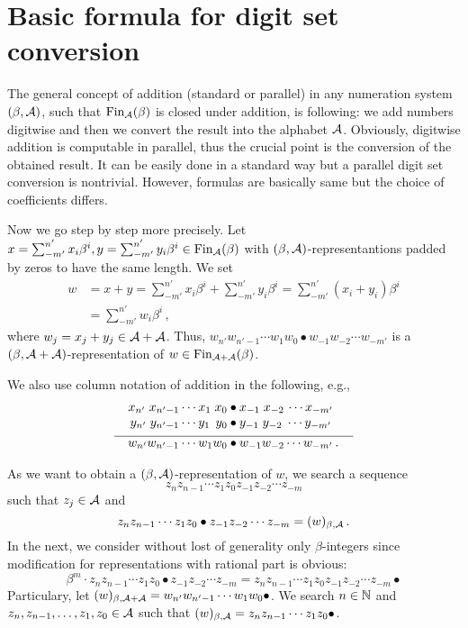 \section{Basic formula for digit set conversion}
The general concept of addition (standard or parallel) in any numeration system $(\beta,\mathcal{A})$, such that $\text{Fin}_{\mathcal{A}}(\beta)$ is closed under addition, is following: we add numbers digitwise and then we convert the result into the alphabet $\mathcal{A}$. Obviously, digitwise addition is computable in parallel, thus the crucial point is the conversion of the obtained result. It can be easily done in a standard way but a parallel digit set conversion is nontrivial. However, formulas are basically same but the choice of coefficients differs.

Now we go step by step more precisely. Let $x=\sum_{-m'}^{n'} x_i\beta^i,y=\sum_{-m'}^{n'} y_i\beta^i \in \text{Fin}_{\mathcal{A}}(\beta)$ with $(\beta,\mathcal{A})$-representantions padded by zeros to have the same length. We set 
  \begin{align*}
    w&=x+y =\sum_{-m'}^{n'} x_i\beta^i + \sum_{-m'}^{n'} y_i\beta^i = \sum_{-m'}^{n'} (x_i+y_i)\beta^i \\
    &=\sum_{-m'}^{n'} w_i\beta^i \,,
  \end{align*}
  where $w_j=x_j+y_j \in \mathcal{A} +\mathcal{A}$. Thus, $w_{n'} w_{{n'}-1}\cdots w_1 w_0 \bullet w_{-1} w_{-2} \cdots w_{-m'}$ is a  $(\beta, \mathcal{A}+\mathcal{A})$-representation of $w\in \text{Fin}_{\mathcal{A}+\mathcal{A}}(\beta)$. 

We also use column notation of addition in the following, e.g.,     
  \begin{align*}
  x_{n'} \;x_{{n'}-1}\cdots x_1 \;x_0 &\bullet x_{-1} \;x_{-2}\, \cdots x_{-m'} \\[-3pt]
  y_{n'} \;y_{{n'}-1}\cdots y_1 \,\;y_0 &\bullet y_{-1} \;y_{-2} \;\cdots y_{-m'} \\[-7pt]
    \line(1,0){90} & \line(1,0){100} \\[-7pt]
  w_{n'} w_{{n'}-1}\cdots w_1 w_0 &\bullet w_{-1} w_{-2} \cdots w_{-m'}\,.
  \end{align*}
  
As we want to obtain a $(\beta,\mathcal{A})$-representation of $w$, we search a sequence 
  $$z_{n} z_{n-1}\cdots z_1 z_0 z_{-1} z_{-2} \cdots z_{-m}$$ such that $z_j \in \mathcal{A}$ and
  $$
    z_{n} z_{n-1}\cdots z_1 z_0 \bullet z_{-1} z_{-2} \cdots z_{-m}=(w)_{\beta,\mathcal{A}}\,.
  $$
  In the next, we consider without lost of generality only $\beta$-integers since modification for representations with rational part is obvious:
  $$
  \beta^m \cdot z_{n} z_{n-1}\cdots z_1 z_0 \bullet z_{-1} z_{-2} \cdots z_{-m} = z_{n} z_{n-1}\cdots z_1 z_0 z_{-1} z_{-2} \cdots z_{-m} \bullet
  $$  
  Particulary, let $(w)_{\beta, \mathcal{A}+\mathcal{A}}=w_{n'} w_{{n'}-1}\cdots w_1 w_0 \bullet$. We search $n \in \mathbb{N}$ and $z_{n}, z_{n-1},\dots, z_1, z_0 \in \mathcal{A}$ such that $(w)_{\beta, \mathcal{A}}=z_{n} z_{n-1}\cdots z_1 z_0 \bullet$.   
  
